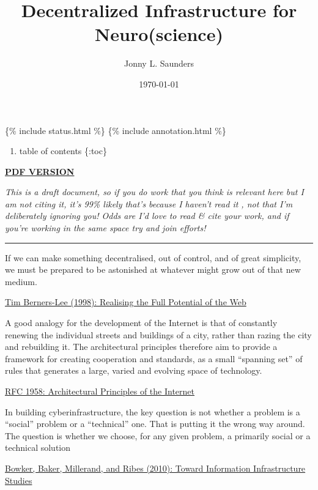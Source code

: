 \documentclass[10pt]{article}
\title{Decentralized Infrastructure for Neuro(science)}
\author{Jonny L. Saunders}
\date{\today}
\begin{document}
\maketitle
\tableofcontents
\pagebreak

\{\% include status.html \%\} \{\% include annotation.html \%\}

\begin{enumerate}
\def\labelenumi{\arabic{enumi}.}

\item
  table of contents \{:toc\}
\end{enumerate}

\href{https://jon-e.net/infrastructure/tex/decentralized_infrastructure_render.pdf}{\textbf{PDF
VERSION}}

\emph{This is a draft document, so if you do work that you think is
relevant here but I am not citing it, it's 99\% likely that's because I
haven't read it , not that I'm deliberately ignoring you! Odds are I'd
love to read \& cite your work, and if you're working in the same space
try and join efforts!}

\begin{center}\rule{0.5\linewidth}{0.5pt}\end{center}

\begin{leftbar}
If we can make something decentralised, out of control, and of great
simplicity, we must be prepared to be astonished at whatever might grow
out of that new medium.

\href{https://www.w3.org/1998/02/Potential.html}{Tim Berners-Lee (1998):
Realising the Full Potential of the Web}
\end{leftbar}

\begin{leftbar}
A good analogy for the development of the Internet is that of constantly
renewing the individual streets and buildings of a city, rather than
razing the city and rebuilding it. The architectural principles
therefore aim to provide a framework for creating cooperation and
standards, as a small ``spanning set'' of rules that generates a large,
varied and evolving space of technology.

\href{https://datatracker.ietf.org/doc/html/rfc1958}{RFC 1958:
Architectural Principles of the Internet}
\end{leftbar}

\begin{leftbar}
In building cyberinfrastructure, the key question is not whether a
problem is a ``social'' problem or a ``technical'' one. That is putting
it the wrong way around. The question is whether we choose, for any
given problem, a primarily social or a technical solution

\href{https://doi.org/10.1007/978-1-4020-9789-8_5}{Bowker, Baker,
Millerand, and Ribes (2010): Toward Information Infrastructure Studies}
\cite{bowkerInformationInfrastructureStudies2010} 
\end{leftbar}
\end{document}
